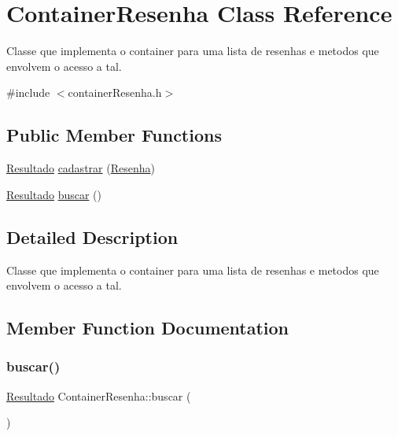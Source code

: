 \hypertarget{classContainerResenha}{}\section{Container\+Resenha Class Reference}
\label{classContainerResenha}


Classe que implementa o container para uma lista de resenhas e metodos que envolvem o acesso a tal.  




{\ttfamily \#include $<$container\+Resenha.\+h$>$}

\subsection*{Public Member Functions}
\begin{DoxyCompactItemize}
\item 
\hyperlink{classResultado}{Resultado} \hyperlink{classContainerResenha_a466bb33109ea836978c81bf227d5653b}{cadastrar} (\hyperlink{classResenha}{Resenha})
\item 
\hyperlink{classResultado}{Resultado} \hyperlink{classContainerResenha_af9d3273c5f38b68673b419defe24a4c6}{buscar} ()
\end{DoxyCompactItemize}


\subsection{Detailed Description}
Classe que implementa o container para uma lista de resenhas e metodos que envolvem o acesso a tal. 

\subsection{Member Function Documentation}
\mbox{\label{classContainerResenha_af9d3273c5f38b68673b419defe24a4c6}} 
\subsubsection{\texorpdfstring{buscar()}{buscar()}}
{\footnotesize\ttfamily \hyperlink{classResultado}{Resultado} Container\+Resenha\+::buscar (\begin{DoxyParamCaption}{ }\end{DoxyParamCaption})}

